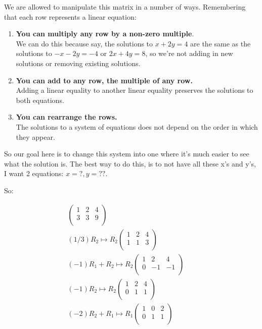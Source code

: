 We are allowed to manipulate this matrix in a number of ways.  Remembering that each row represents a linear equation:

\begin{enumerate}
\item \textbf{You can multiply any row by a non-zero multiple}.\\ 

We can do this because say, the solutions to $x+2y=4$ are the same as the solutions to $-x-2y=-4$ or $2x+4y=8$, so we're not adding in new solutions or removing existing solutions.

\item \textbf{You can add to any row, the multiple of any row.}\\

Adding a linear equality to another linear equality preserves the solutions to both equations.

\item \textbf{You can rearrange the rows.}\\

The solutions to a system of equations does not depend on the order in which they appear.

\end{enumerate}


So our goal here is to change this system into one where it's much easier to see what the solution is.  The best way to do this, is to not have all these x's and y's, I want 2 equations: $x=?, y=??$.

So:

\begin{eqnarray*}
\left( \begin{array}{rr|r}
1 & 2 & 4\\
3 & 3  & 9\\
\end{array}\right)&&\\
(1/3)R_2\mapsto R_2 \left( \begin{array}{rr|r}
1 & 2 & 4\\
1 & 1  & 3\\
\end{array}\right)&&\\
(-1)R_1+R_2\mapsto R_2 \left( \begin{array}{rr|r}
1 & 2 & 4\\
0 & -1  & -1\\
\end{array}\right)&&\\
(-1)R_2\mapsto R_2 \left( \begin{array}{rr|r}
1 & 2 & 4\\
0 & 1  & 1\\
\end{array}\right)&&\\
(-2)R_2+R_1\mapsto R_1 \left( \begin{array}{rr|r}
1 & 0 & 2\\
0 & 1  & 1\\
\end{array}\right)&&\\
\end{eqnarray*}





